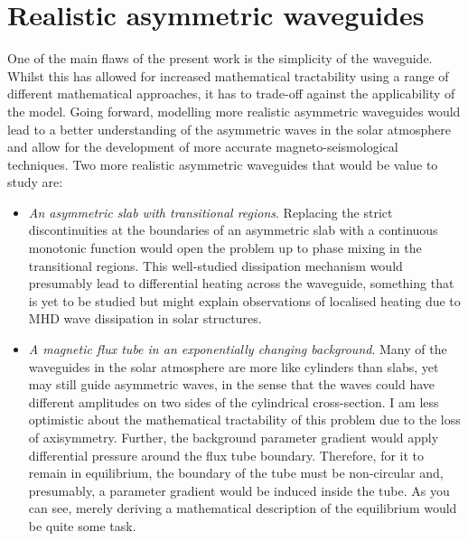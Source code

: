 \documentclass[12pt]{../style-files/ociamthesis}
\begin{document}
\section{Realistic asymmetric waveguides}
One of the main flaws of the present work is the simplicity of the waveguide. Whilst this has allowed for increased mathematical tractability using a range of different mathematical approaches, it has to trade-off against the applicability of the model. Going forward, modelling more realistic asymmetric waveguides would lead to a better understanding of the asymmetric waves in the solar atmosphere and allow for the development of more accurate magneto-seismological techniques. Two more realistic asymmetric waveguides that would be value to study are:
\begin{itemize}
	\item \textit{An asymmetric slab with transitional regions}. Replacing the strict discontinuities at the boundaries of an asymmetric slab with a continuous monotonic function would open the problem up to phase mixing in the transitional regions. This well-studied dissipation mechanism  would presumably lead to differential heating across the waveguide, something that is yet to be studied but might explain observations of localised heating due to MHD wave dissipation in solar structures.
	\item \textit{A magnetic flux tube in an exponentially changing background}. Many of the waveguides in the solar atmosphere are more like cylinders than slabs, yet may still guide asymmetric waves, in the sense that the waves could have different amplitudes on two sides of the cylindrical cross-section. I am less optimistic about the mathematical tractability of this problem due to the loss of axisymmetry. Further, the background parameter gradient would apply differential pressure around the flux tube boundary. Therefore, for it to remain in equilibrium, the boundary of the tube must be non-circular and, presumably, a parameter gradient would be induced inside the tube. As you can see, merely deriving a mathematical description of the equilibrium would be quite some task.
\end{itemize}


%
%





\end{document}
